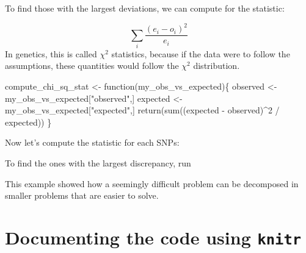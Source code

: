 \documentclass[
  letterpaper,
  DIV=11,
  numbers=noendperiod]{scrreprt}
\newenvironment{Shaded}{\begin{snugshade}}{\end{snugshade}}
\newcommand{\NormalTok}[1]{\textcolor[rgb]{0.00,0.23,0.31}{#1}}
\begin{document}
To find those with the largest deviations, we can compute for the
statistic:

\[
\sum_i \frac{(e_i - o_i)^2}{e_i}
\] In genetics, this is called \(\chi^2\) statistics, because if the
data were to follow the assumptions, these quantities would follow the
\(\chi^2\) distribution.

\begin{Shaded}
\begin{Highlighting}[]
\NormalTok{compute\_chi\_sq\_stat \textless{}{-} function(my\_obs\_vs\_expected)\{}
\NormalTok{  observed \textless{}{-} my\_obs\_vs\_expected["observed",]}
\NormalTok{  expected \textless{}{-} my\_obs\_vs\_expected["expected",]}
\NormalTok{  return(sum((expected {-} observed)\^{}2 / expected))}
\NormalTok{\}}
\end{Highlighting}
\end{Shaded}

Now let's compute the statistic for each SNPs:

\begin{Shaded}
\end{Shaded}

To find the ones with the largest discrepancy, run

\begin{Shaded}
\end{Shaded}

This example showed how a seemingly difficult problem can be decomposed
in smaller problems that are easier to solve.

\section*{\texorpdfstring{Documenting the code using
\texttt{knitr}}{Documenting the code using knitr}}\label{documenting-the-code-using-knitr}
\end{document}
